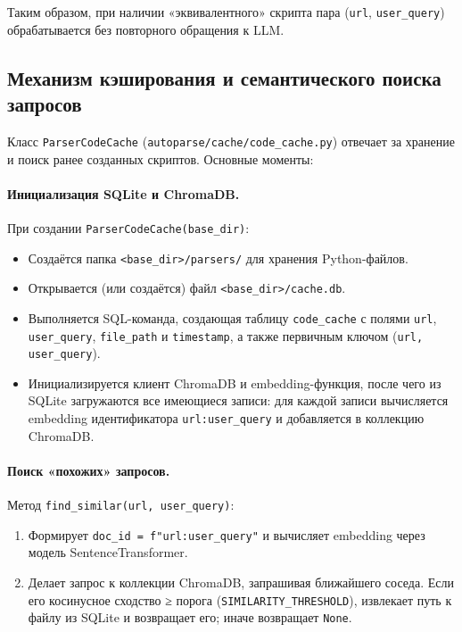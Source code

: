 Таким образом, при наличии «эквивалентного» скрипта пара (\texttt{url}, \texttt{user\_query}) обрабатывается без повторного обращения к LLM.

\subsection{Механизм кэширования и семантического поиска запросов}
\label{subsec:solution4}

Класс \texttt{ParserCodeCache} (\texttt{autoparse/cache/code\_cache.py}) отвечает за хранение и поиск ранее созданных скриптов. Основные моменты:

\paragraph{Инициализация SQLite и ChromaDB.}
При создании \texttt{ParserCodeCache(base\_dir)}:
\begin{itemize}
    \item Создаётся папка \texttt{<base\_dir>/parsers/} для хранения Python-файлов.
    \item Открывается (или создаётся) файл \texttt{<base\_dir>/cache.db}.
    \item Выполняется SQL-команда, создающая таблицу \texttt{code\_cache} с полями \texttt{url}, \texttt{user\_query}, \texttt{file\_path} и \texttt{timestamp}, а также первичным ключом (\texttt{url, user\_query}).
    \item Инициализируется клиент ChromaDB и embedding-функция, после чего из SQLite загружаются все имеющиеся записи: для каждой записи вычисляется embedding идентификатора \texttt{url:user\_query} и добавляется в коллекцию ChromaDB.
\end{itemize}

\paragraph{Поиск «похожих» запросов.}
Метод \texttt{find\_similar(url, user\_query)}:
\begin{enumerate}
    \item Формирует \texttt{doc\_id = f"{url}:{user\_query}"} и вычисляет embedding через модель SentenceTransformer.
    \item Делает запрос к коллекции ChromaDB, запрашивая ближайшего соседа. Если его косинусное сходство ≥ порога (\texttt{SIMILARITY\_THRESHOLD}), извлекает путь к файлу из SQLite и возвращает его; иначе возвращает \texttt{None}.
\end{enumerate}

